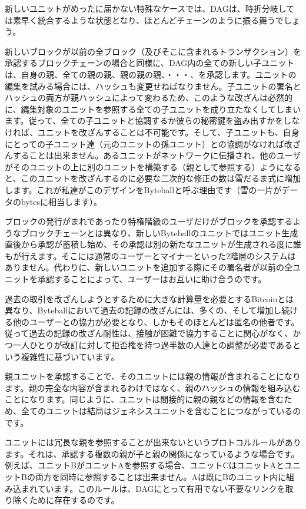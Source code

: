\documentclass[a4paper, dvipdfmx]{jsarticle}
\begin{document}
新しいユニットがめったに届かない特殊なケースでは、DAGは、時折分岐しては素早く統合するような状態となり、ほとんどチェーンのように振る舞うでしょう。

新しいブロックが以前の全ブロック（及びそこに含まれるトランザクション）を承認するブロックチェーンの場合と同様に、DAG内の全ての新しい子ユニットは、自身の親、全ての親の親、親の親の親、・・・、を承認します。ユニットの編集を試みる場合には、ハッシュも変更せねばなりません。子ユニットの署名とハッシュの両方が親ハッシュによって変わるため、このような改ざんは必然的に、編集対象のユニットを参照する全ての子ユニットを成り立たなくしてしまいます。従って、全ての子ユニットと協調するか彼らの秘密鍵を盗み出すかをしなければ、ユニットを改ざんすることは不可能です。そして、子ユニットも、自身にとっての子ユニット達（元のユニットの孫ユニット）との協調がなければ改ざんすることは出来ません。あるユニットがネットワークに伝播され、他のユーザがそのユニットの上に別のユニットを構築する（親として参照する）ようになると、このユニットを改ざんするのに必要な二次的な修正の数は雪だるま式に増加します。これが私達がこのデザインをByteballと呼ぶ理由です（雪の一片がデータのbytesに相当します）。

ブロックの発行がまれであったり特権階級のユーザだけがブロックを承認するようなブロックチェーンとは異なり、新しいByteballのユニットではユニット生成直後から承認が蓄積し始め、その承認は別の新たなユニットが生成される度に誰もが行えます。そこには通常のユーザーとマイナーといった2階層のシステムはありません。代わりに、新しいユニットを追加する際にその署名者が以前の全ユニットを承認することによって、ユーザーはお互いに助け合うのです。

過去の取引を改ざんしようとするために大きな計算量を必要とするBitcoinとは異なり、Byteballにおいて過去の記録の改ざんには、多くの、そして増加し続ける他のユーザーとの協力が必要となり、しかもそのほとんどは匿名の他者です。従って過去の記録の改ざん耐性は、接触が困難で協力することに関心がなく、かつ一人ひとりが改訂に対して拒否権を持つ過半数の人達との調整が必要であるという複雑性に基づいています。

親ユニットを承認することで、そのユニットには親の情報が含まれることになります。親の完全な内容が含まれるわけではなく、親のハッシュの情報を組み込むことになります。同じように、ユニットは間接的に親の親などの情報を含むため、全てのユニットは結局はジェネシスユニットを含むことにつながっているのです。

ユニットには冗長な親を参照することが出来ないというプロトコルルールがあります。それは、承認する複数の親が子と親の関係になっているような場合です。例えば、ユニットBがユニットAを参照する場合、ユニットCはユニットAとユニットBの両方を同時に参照することは出来ません。Aは既にBのユニット内に組み込まれています。このルールは、DAGにとって有用でない不要なリンクを取り除くために存在するのです。
\end{document}
